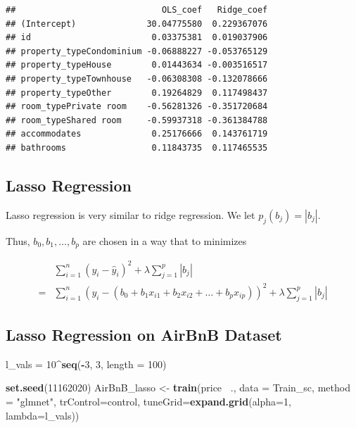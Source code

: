 \documentclass[]{book}
\newenvironment{Shaded}{\begin{snugshade}}{\end{snugshade}}
\newcommand{\KeywordTok}[1]{\textcolor[rgb]{0.13,0.29,0.53}{\textbf{#1}}}
\newcommand{\DataTypeTok}[1]{\textcolor[rgb]{0.13,0.29,0.53}{#1}}
\newcommand{\DecValTok}[1]{\textcolor[rgb]{0.00,0.00,0.81}{#1}}
\newcommand{\StringTok}[1]{\textcolor[rgb]{0.31,0.60,0.02}{#1}}
\newcommand{\OperatorTok}[1]{\textcolor[rgb]{0.81,0.36,0.00}{\textbf{#1}}}
\newcommand{\NormalTok}[1]{#1}
\begin{document}
\begin{verbatim}
##                             OLS_coef   Ridge_coef
## (Intercept)              30.04775580  0.229367076
## id                        0.03375381  0.019037906
## property_typeCondominium -0.06888227 -0.053765129
## property_typeHouse        0.01443634 -0.003516517
## property_typeTownhouse   -0.06308308 -0.132078666
## property_typeOther        0.19264829  0.117498437
## room_typePrivate room    -0.56281326 -0.351720684
## room_typeShared room     -0.59937318 -0.361384788
## accommodates              0.25176666  0.143761719
## bathrooms                 0.11843735  0.117465535
\end{verbatim}

\subsection{Lasso Regression}\label{lasso-regression}

Lasso regression is very similar to ridge regression. We let
\(p_j(b_j) = |b_j|\).

Thus, \(b_0, b_1, \ldots, b_p\) are chosen in a way that to minimizes

\[
\begin{aligned}
& \displaystyle\sum_{i=1}^n (y_i -\hat{y}_i)^2  + \lambda\displaystyle\sum_{j=1}^p|b_j|\\ =  & \displaystyle\sum_{i=1}^n (y_i -(b_0 + b_1x_{i1} + b_2x_{i2} + \ldots + b_px_{ip}))^2 + \lambda\displaystyle\sum_{j=1}^p|b_j|
\end{aligned}
\]

\subsection{Lasso Regression on AirBnB
Dataset}\label{lasso-regression-on-airbnb-dataset}

\begin{Shaded}
\begin{Highlighting}[]
\NormalTok{l_vals =}\StringTok{ }\DecValTok{10}\OperatorTok{^}\KeywordTok{seq}\NormalTok{(}\OperatorTok{-}\DecValTok{3}\NormalTok{, }\DecValTok{3}\NormalTok{, }\DataTypeTok{length =} \DecValTok{100}\NormalTok{)}

\KeywordTok{set.seed}\NormalTok{(}\DecValTok{11162020}\NormalTok{)}
\NormalTok{AirBnB_lasso <-}\StringTok{ }\KeywordTok{train}\NormalTok{(price }\OperatorTok{~}\NormalTok{., }\DataTypeTok{data =}\NormalTok{ Train_sc, }\DataTypeTok{method =} \StringTok{"glmnet"}\NormalTok{, }\DataTypeTok{trControl=}\NormalTok{control, }
                      \DataTypeTok{tuneGrid=}\KeywordTok{expand.grid}\NormalTok{(}\DataTypeTok{alpha=}\DecValTok{1}\NormalTok{, }\DataTypeTok{lambda=}\NormalTok{l_vals))}
\end{Highlighting}
\end{Shaded}
\end{document}
